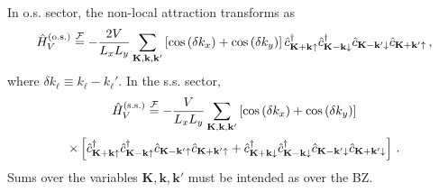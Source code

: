 In o.s. sector, the non-local attraction transforms as
\begin{equation}\label{eq:HV-os-fourier}
	\hat H_V^{(\mathrm{o.s.})} \stackrel{\mathcal{F}}{=} - \frac{2V}{L_x L_y}
	\sum_{\mathbf{K}, \mathbf{k}, \mathbf{k}'} \left[
	\cos \left(
	\delta k_x
	\right)	+ \cos \left(
	\delta k_y
	\right)	
	\right]	\hat c_{\mathbf{K}+\mathbf{k} \uparrow}^\dagger \hat c_{\mathbf{K}-\mathbf{k}\downarrow}^\dagger \hat c_{\mathbf{K}-\mathbf{k}'\downarrow} \hat c_{\mathbf{K}+\mathbf{k}'\uparrow} \, ,
\end{equation}
where $\delta k_\ell \equiv k_\ell - k_\ell'$. In the s.s. sector,
\begin{multline}\label{eq:HV-ss-fourier}
	\hat H_V^{(\mathrm{s.s.})} \stackrel{\mathcal{F}}{=} - \frac{V}{L_x L_y}
	\sum_{\mathbf{K}, \mathbf{k}, \mathbf{k}'} \left[
	\cos \left(
	\delta k_x
	\right)	+ \cos \left(
	\delta k_y
	\right)	
	\right]\\
	\times \left[
	\hat c_{\mathbf{K}+\mathbf{k} \uparrow}^\dagger \hat c_{\mathbf{K}-\mathbf{k}\uparrow}^\dagger \hat c_{\mathbf{K}-\mathbf{k}'\uparrow} \hat c_{\mathbf{K}+\mathbf{k}'\uparrow} + \hat c_{\mathbf{K}+\mathbf{k} \downarrow}^\dagger \hat c_{\mathbf{K}-\mathbf{k}\downarrow}^\dagger \hat c_{\mathbf{K}-\mathbf{k}'\downarrow} \hat c_{\mathbf{K}+\mathbf{k}'\downarrow}
	\right] \, .
\end{multline}
Sums over the variables $\mathbf{K}, \mathbf{k}, \mathbf{k}'$ must be intended as over the BZ.

